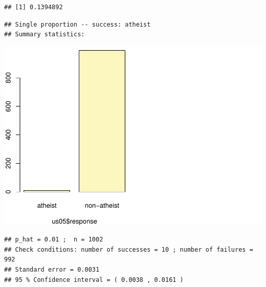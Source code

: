 \documentclass[]{article}
\newenvironment{Shaded}{\begin{snugshade}}{\end{snugshade}}
\newcommand{\KeywordTok}[1]{\textcolor[rgb]{0.13,0.29,0.53}{\textbf{#1}}}
\newcommand{\DataTypeTok}[1]{\textcolor[rgb]{0.13,0.29,0.53}{#1}}
\newcommand{\StringTok}[1]{\textcolor[rgb]{0.31,0.60,0.02}{#1}}
\newcommand{\OperatorTok}[1]{\textcolor[rgb]{0.81,0.36,0.00}{\textbf{#1}}}
\newcommand{\NormalTok}[1]{#1}
\begin{document}
\begin{verbatim}
## [1] 0.1394892
\end{verbatim}

\begin{Shaded}
\end{Shaded}

\begin{verbatim}
## Single proportion -- success: atheist 
## Summary statistics:
\end{verbatim}

\includegraphics{DATA_606_Lab_6_files/figure-latex/unnamed-chunk-7-1.pdf}

\begin{verbatim}
## p_hat = 0.01 ;  n = 1002 
## Check conditions: number of successes = 10 ; number of failures = 992 
## Standard error = 0.0031 
## 95 % Confidence interval = ( 0.0038 , 0.0161 )
\end{verbatim}

\begin{Shaded}
\end{Shaded}
\end{document}
